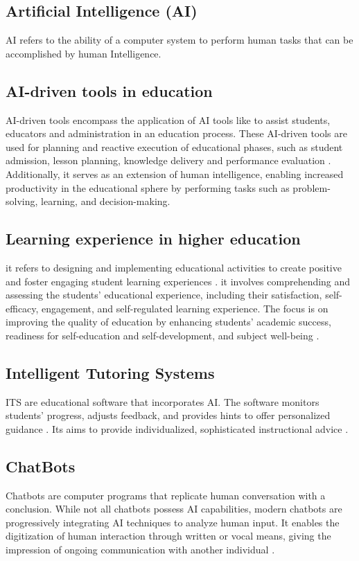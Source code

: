\subsection{Artificial Intelligence (AI)}
AI refers to the ability of a computer system to perform human
tasks that can be accomplished by human Intelligence\citep{sadiku_ai_2021}.
\subsection{AI-driven tools in education}
AI-driven tools encompass the application of AI tools like  to assist
students, educators and administration in an education process.
These AI-driven tools are used for planning and reactive execution of educational phases, such as
student admission, lesson planning, knowledge delivery and performance evaluation \citep{mallik_proactive_2023}.
Additionally, it serves as an extension of human intelligence, enabling
increased productivity in the educational sphere by performing tasks
such as problem-solving, learning, and decision-making\citep{cheng_widespread_2023}.
\subsection{Learning experience in higher education}
it refers to designing and implementing educational activities to create
positive and foster engaging student learning experiences \citep{kang_supporting_2023}.
it involves comprehending and assessing the students’ educational experience, including
their satisfaction, self-efficacy, engagement, and self-regulated learning experience\citep{lyz_students_2022}.
The focus is on improving the quality of education by enhancing students’ academic success,
readiness for self-education and self-development, and subject well-being \citep{iordache-platis_building_2018}.
\subsection{Intelligent Tutoring Systems}
ITS are educational software that incorporates AI. The software monitors students'
progress, adjusts feedback, and provides hints to offer personalized
guidance \citep{shute_intelligent_2010}. Its aims to provide individualized, sophisticated instructional advice
\citep{sedlmeier_intelligent_2001}.
\subsection{ ChatBots }
Chatbots are computer programs that replicate human conversation with a conclusion.
While not all chatbots possess AI capabilities, modern chatbots are progressively
integrating AI techniques to analyze human input\citep{IBM_withnodate}.
It enables the digitization of human interaction through written
or vocal means, giving the impression of ongoing communication with another individual \citep{oracle_what_nodate}.
